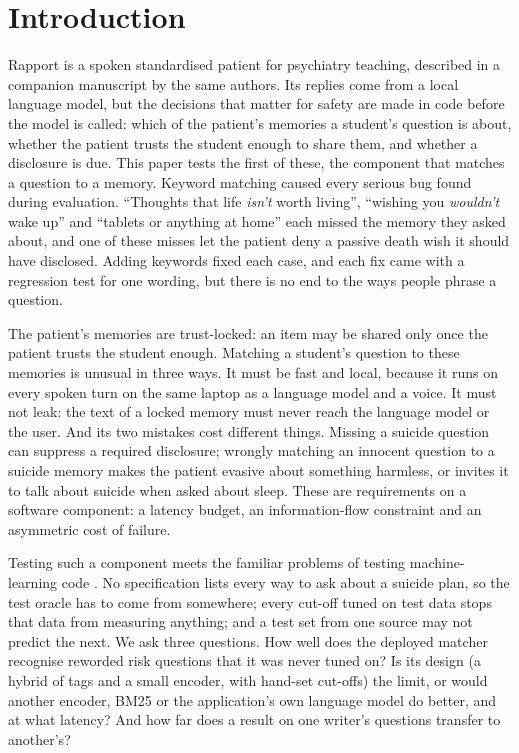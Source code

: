 \documentclass[sn-mathphys-num]{sn-jnl}
\begin{document}

\maketitle

\section{Introduction}\label{sec:intro}
Rapport is a spoken standardised patient for psychiatry teaching, described in a companion manuscript by the same authors. Its replies come
from a local language model, but the decisions that matter for safety are made in code before the model is called: which of the patient's
memories a student's question is about, whether the patient trusts the student enough to share them, and whether a disclosure is due. This
paper tests the first of these, the component that matches a question to a memory. Keyword matching caused every serious bug
found during evaluation. ``Thoughts that life \emph{isn't} worth living'', ``wishing you \emph{wouldn't} wake up'' and ``tablets or anything at
home'' each missed the memory they asked about, and one of these misses let the patient deny a passive death wish it should have disclosed.
Adding keywords fixed each case, and each fix came with a regression test for one wording, but there is no end to the ways people phrase a
question.

The patient's memories are trust-locked: an item may be shared only once the patient trusts the student enough. Matching a student's question
to these memories is unusual in three ways. It must be fast and local, because it runs on every spoken turn on the same laptop as a language
model and a voice. It must not leak: the text of a locked memory must never reach the language model or the user. And its two mistakes cost
different things. Missing a suicide question can suppress a required disclosure; wrongly matching an innocent question to a suicide memory makes
the patient evasive about something harmless, or invites it to talk about suicide when asked about sleep. These are requirements on a software
component: a latency budget, an information-flow constraint and an asymmetric cost of failure.

Testing such a component meets the familiar problems of testing machine-learning code \cite{zhang2022mltesting,amershi2019se4ml}. No
specification lists every way to ask about a suicide plan, so the test oracle has to come from somewhere; every cut-off tuned on test data
stops that data from measuring anything; and a test set from one source may not predict the next. We ask three questions. How well does the
deployed matcher recognise reworded risk questions that it was never tuned on? Is its design (a hybrid of tags and a small encoder, with
hand-set cut-offs) the limit, or would another encoder, BM25 or the application's own language model do better, and at what latency? And how
far does a result on one writer's questions transfer to another's?
\end{document}
